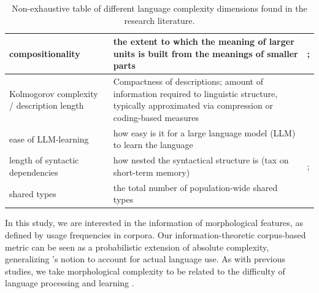\documentclass[USenglish]{article}
\begin{document}
\begin{table}[ht]
\begin{tabular}{p{2.2cm}p{4cm}p{6cm}}
compositionality  & the extent to which the meaning of larger units is built from the meanings of smaller parts &  \cite{wraygrace2007}; \citet{lindsay-smith_analogy_2024} \\  \midrule
Kolmogorov complexity / description length & Compactness of descriptions; amount of information required to linguistic structure, typically approximated via compression or coding-based measures &  \cite{kolmogorov_three_1965, juola1998measuring, dahl2004growth, aceves2024human,  sagot_comparing_2013, ehret_information-theoretic_2016}  \\    \midrule
ease of LLM-learning  & how easy is it for a large language model (LLM) to learn the language &  \cite{koplenig2023languages}  \\    \midrule
length of syntactic dependencies  &  how nested the syntactical structure is (tax on short-term memory) & \cite{gibson1998linguistic}; \citet{liu2008dependency} \\    
\midrule
shared types & the total number of population-wide shared types &  \citet{spike2017population}\\
\bottomrule
    \end{tabular}
    \caption{Non-exhaustive table of different language complexity dimensions found in the research literature.}
    \label{tab:complex_metrics}
\end{table}

In this study, we are interested in the information of morphological features, as defined by usage frequencies in corpora.
Our information-theoretic corpus-based metric can be seen as a probabilistic extension of absolute complexity, generalizing \citet{miestamo_feasibility_2006, miestamo_grammatical_2008}’s notion to account for actual language use.
As with previous studies, we take morphological complexity to be related to the difficulty of language processing and learning \citep{findlay_effects_1995, cohen-mimran_effect_2013, mehravari_effects_2015, bentz_learning_2016}.
\end{document}
